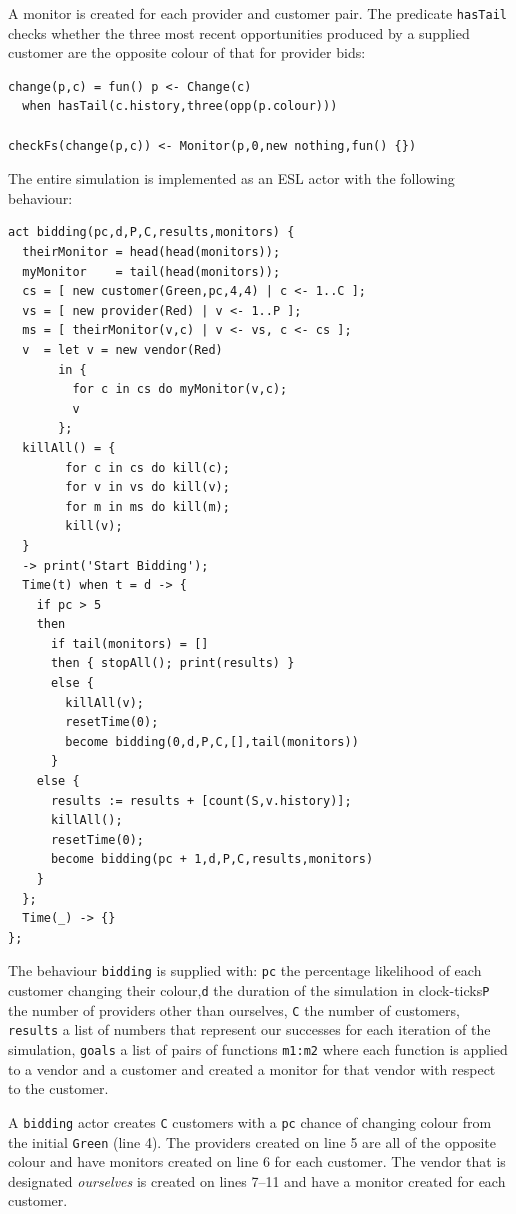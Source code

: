 \documentclass[10pt,numbers]{sigplanconf}
\def\code#1{{\normalfont\lstinline[basicstyle=\small\ttfamily]{#1}}}
\begin{document}
A monitor is created for each provider and customer pair. The predicate \code{hasTail} checks whether the three most recent opportunities produced by a supplied customer are the opposite colour of that for provider bids:
\begin{lstlisting}
change(p,c) = fun() p <- Change(c)
  when hasTail(c.history,three(opp(p.colour)))
  
checkFs(change(p,c)) <- Monitor(p,0,new nothing,fun() {})
\end{lstlisting}
The entire simulation is implemented as an ESL actor with the following behaviour:
\begin{lstlisting}[numbers=right]
act bidding(pc,d,P,C,results,monitors) {
  theirMonitor = head(head(monitors));
  myMonitor    = tail(head(monitors));
  cs = [ new customer(Green,pc,4,4) | c <- 1..C ];
  vs = [ new provider(Red) | v <- 1..P ];
  ms = [ theirMonitor(v,c) | v <- vs, c <- cs ];
  v  = let v = new vendor(Red) 
       in { 
         for c in cs do myMonitor(v,c); 
         v 
       };
  killAll() = {
        for c in cs do kill(c);
        for v in vs do kill(v);
        for m in ms do kill(m);
        kill(v);
  }
  -> print('Start Bidding');
  Time(t) when t = d -> {
    if pc > 5
    then 
      if tail(monitors) = []
      then { stopAll(); print(results) }
      else {
        killAll(v);
        resetTime(0);
        become bidding(0,d,P,C,[],tail(monitors))
      }
    else {
      results := results + [count(S,v.history)];
      killAll();
      resetTime(0);
      become bidding(pc + 1,d,P,C,results,monitors)
    }
  };
  Time(_) -> {}
};
\end{lstlisting}
The behaviour \code{bidding} is supplied with:
\code{pc} the percentage likelihood of each customer changing their colour,\code{d} the duration of the simulation in clock-ticks\code{P} the number of providers other than ourselves, \code{C} the number of customers, \code{results} a list of numbers that represent our successes for each iteration of the simulation, \code{goals} a list of pairs of functions \code{m1:m2} where each function is applied to a vendor and a customer and created a monitor for that vendor with respect to the customer.

A \code{bidding} actor creates \code{C} customers with a \code{pc} chance of changing colour from the initial \code{Green} (line 4). The providers created on line 5 are all of the opposite colour and have monitors created on line 6 for each customer. The vendor that is designated {\it ourselves} is created on lines 7--11 and have a monitor created for each customer.
\end{document}
